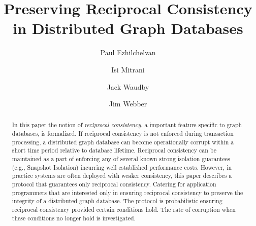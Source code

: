 \documentclass[sigplan,10pt]{acmart}
\begin{document}
\title{Preserving Reciprocal Consistency in Distributed Graph Databases}

\author{Paul Ezhilchelvan}

\author{Isi Mitrani}

\author{Jack Waudby}

\author{Jim Webber}


\renewcommand{\shortauthors}{Ezhilchelvan, et al.}

\begin{abstract}
  In this paper the notion of \textit{reciprocal consistency}, a important feature specific to graph databases, is formalized. If reciprocal consistency is not enforced during transaction processing, a distributed graph database can become operationally corrupt within a short time period relative to database lifetime. Reciprocal consistency can be maintained as a part of enforcing any of several known strong isolation guarantees (e.g., Snapshot Isolation) incurring well established performance costs. However, in practice systems are often deployed with weaker consistency, this paper describes a protocol that guarantees only reciprocal consistency. Catering for application programmers that are interested only in ensuring reciprocal consistency to preserve the integrity of a distributed graph database. The protocol is probabilistic ensuring reciprocal consistency provided certain conditions hold. The rate of corruption when these conditions no longer hold is investigated.
\end{abstract}
\end{document}
